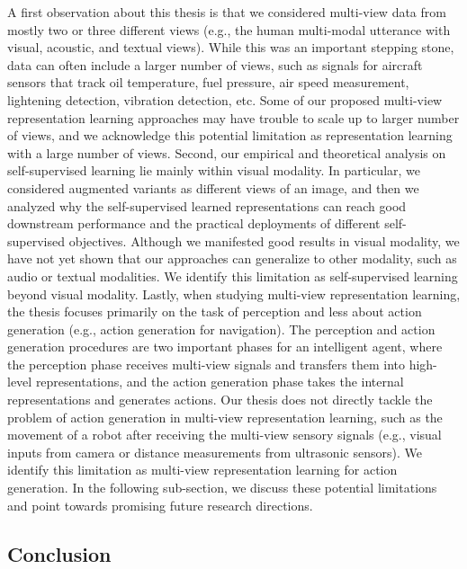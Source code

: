A first observation about this thesis is that we considered multi-view data from mostly two or three different
views (e.g., the human multi-modal utterance with visual, acoustic, and textual views). While this was
an important stepping stone, data can often include a larger number of views, such as signals for aircraft
sensors that track oil temperature, fuel pressure, air speed measurement, lightening detection, vibration
detection, etc. Some of our proposed multi-view representation learning approaches may have trouble to
scale up to larger number of views, and we acknowledge this potential limitation as representation learning
with a large number of views. Second, our empirical and theoretical analysis on self-supervised learning lie
mainly within visual modality. In particular, we considered augmented variants as different views of an
image, and then we analyzed why the self-supervised learned representations can reach good downstream
performance and the practical deployments of different self-supervised objectives. Although we manifested
good results in visual modality, we have not yet shown that our approaches can generalize to other modality,
such as audio or textual modalities. We identify this limitation as self-supervised learning beyond visual
modality. Lastly, when studying multi-view representation learning, the thesis focuses primarily on the task
of perception and less about action generation (e.g., action generation for navigation). The perception and
action generation procedures are two important phases for an intelligent agent, where the perception phase
receives multi-view signals and transfers them into high-level representations, and the action generation
phase takes the internal representations and generates actions. Our thesis does not directly tackle the
problem of action generation in multi-view representation learning, such as the movement of a robot after
receiving the multi-view sensory signals (e.g., visual inputs from camera or distance measurements from
ultrasonic sensors). We identify this limitation as multi-view representation learning for action generation.
In the following sub-section, we discuss these potential limitations and point towards promising future
research directions.

\subsection{Conclusion}

